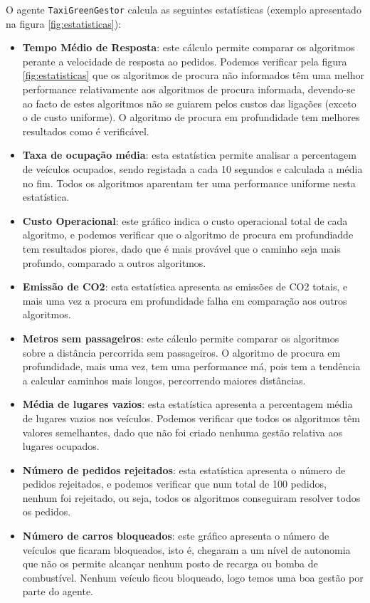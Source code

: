 \documentclass[11pt, a4paper, fleqn]{article}
\begin{document}
	O agente \texttt{TaxiGreenGestor} calcula as seguintes estatísticas (exemplo apresentado na figura \ref{fig:estatisticas}):
	\begin{itemize}
		\item \textbf{Tempo Médio de Resposta}: este cálculo permite comparar os algoritmos perante a velocidade de resposta ao pedidos. Podemos verificar pela figura \ref{fig:estatisticas} que os algoritmos de procura não informados têm uma melhor performance relativamente aos algoritmos de procura informada, devendo-se ao facto de estes algoritmos não se guiarem pelos custos das ligações (exceto o de custo uniforme). O algoritmo de procura em profundidade tem melhores resultados como é verificável.
		\item \textbf{Taxa de ocupação média}: esta estatística permite analisar a percentagem de veículos ocupados, sendo registada a cada 10 segundos e calculada a média no fim. Todos os algoritmos aparentam ter uma performance uniforme nesta estatística.
		\item \textbf{Custo Operacional}: este gráfico indica o custo operacional total de cada algoritmo, e podemos verificar que o algoritmo de procura em profundiadde tem resultados piores, dado que é mais provável que o caminho seja mais profundo, comparado a outros algoritmos.
		\item \textbf{Emissão de CO2}: esta estatística apresenta as emissões de CO2 totais, e mais uma vez a procura em profundidade falha em comparação aos outros algoritmos.
		\item \textbf{Metros sem passageiros}: este cálculo permite comparar os algoritmos sobre a distância percorrida sem passageiros. O algoritmo de procura em profundidade, mais uma vez, tem uma performance má, pois tem a tendência a calcular caminhos mais longos, percorrendo maiores distâncias.
		\item \textbf{Média de lugares vazios}: esta estatística apresenta a percentagem média de lugares vazios nos veículos. Podemos verificar que todos os algoritmos têm valores semelhantes, dado que não foi criado nenhuma gestão relativa aos lugares ocupados.
		\item \textbf{Número de pedidos rejeitados}: esta estatística apresenta o número de pedidos rejeitados, e podemos verificar que num total de 100 pedidos, nenhum foi rejeitado, ou seja, todos os algoritmos conseguiram resolver todos os pedidos.
		\item \textbf{Número de carros bloqueados}: este gráfico apresenta o número de veículos que ficaram bloqueados, isto é, chegaram a um nível de autonomia que não os permite alcançar nenhum posto de recarga ou bomba de combustível. Nenhum veículo ficou bloqueado, logo temos uma boa gestão por parte do agente.
	\end{itemize}
	
\end{document}
